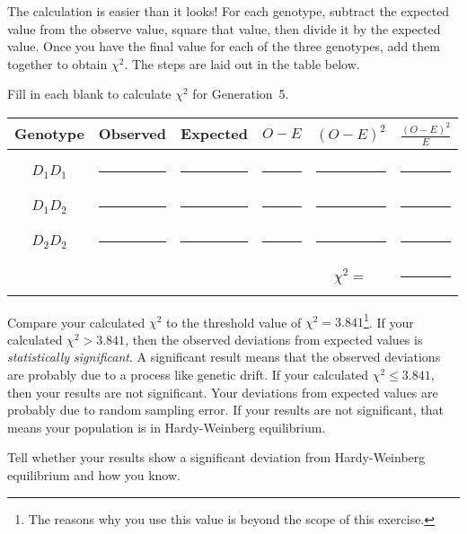 \documentclass[12pt]{exam}
\begin{document}
\begin{questions}
The calculation is easier than it looks! For each genotype, subtract the expected value from the observe value, square that value, then divide it by the expected value. Once you have the final value for each of the three genotypes, add them together to obtain $\chi^2$. The steps are laid out in the table below. 

\question[Checkout]
Fill in each blank to calculate $\chi^2$ for Generation~5.

\begin{longtable}{cccccc}
	\toprule
	Genotype & Observed & Expected & $O-E$ & $(O-E)^2$ & $\frac{(O-E)^2}{E}$ \tabularnewline
	\midrule
	&&&&&\tabularnewline
	$D_1D_1$ & \rule{0.5in}{0.4pt} & \rule{0.5in}{0.4pt} & \rule{0.5in}{0.4pt} & \rule{0.5in}{0.4pt} & \rule{0.5in}{0.4pt}\tabularnewline[2em]
	$D_1D_2$ & \rule{0.5in}{0.4pt} & \rule{0.5in}{0.4pt} & \rule{0.5in}{0.4pt} & \rule{0.5in}{0.4pt} & \rule{0.5in}{0.4pt}\tabularnewline[2em]
	$D_2D_2$ & \rule{0.5in}{0.4pt} & \rule{0.5in}{0.4pt} & \rule{0.5in}{0.4pt} & \rule{0.5in}{0.4pt} & \rule{0.5in}{0.4pt}\tabularnewline[2em]
	&&&& $\chi^2 = $& \rule{0.5in}{0.4pt}\tabularnewline
	\bottomrule
\end{longtable}

Compare your calculated $\chi^2$ to the threshold value of $\chi^2 = 3.841$\footnote{The reasons why you use this value is beyond the scope of this exercise.}. If your calculated $\chi^2 > 3.841$, then the observed deviations from expected values is \emph{statistically significant}. A significant result means that the observed deviations are probably due to a process like genetic drift. If your calculated $\chi^2 \le 3.841$, then your results are not significant. Your deviations from expected values are probably due to random sampling error. If your results are not significant, that means your population is in Hardy-Weinberg equilibrium.

\question[Checkout]
Tell whether your results show a significant deviation from Hardy-Weinberg equilibrium and how you know. 


\end{questions}


\newpage
\end{document}
